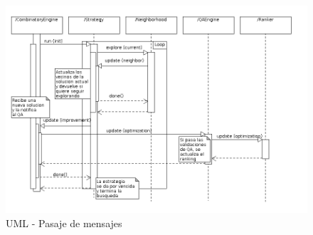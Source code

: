 \begin{figure}
  \centering
  \includegraphics[scale=0.5]{sequence.png}  
  \caption{UML - Pasaje de mensajes}
  \label{uml:sequence}
\end{figure}

